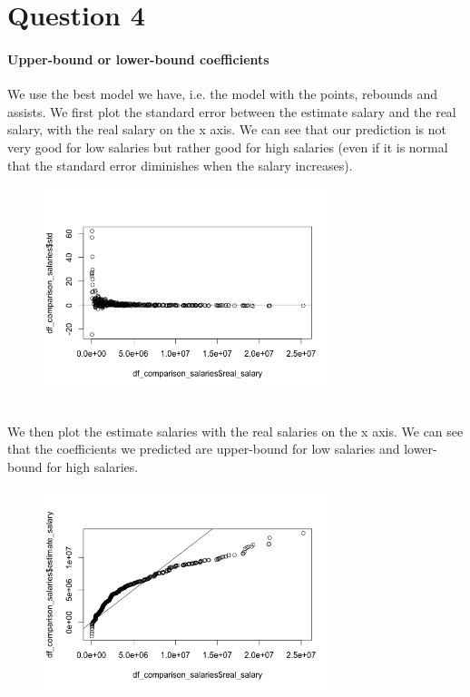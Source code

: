
\section*{Question 4}
\label{subsec:3Q4}

\paragraph{Upper-bound or lower-bound coefficients}We use the best model we have, i.e. the model with the points, rebounds and assists. 
We first plot the standard error between the estimate salary and the real salary, with the real salary on the x axis. We can see that our prediction is not very good for low salaries but rather good for high salaries (even if it is normal that the standard error diminishes when the salary increases).
\begin{figure}[h!]
\centering
\includegraphics[width=0.75\textwidth]{images/Std_error}
\end{figure}
\\
We then plot the estimate salaries with the real salaries on the x axis. We can see that the coefficients we predicted are upper-bound for low salaries and lower-bound for high salaries.
\begin{figure}[h!]
\centering
\includegraphics[width=0.75\textwidth]{images/Estimate_salaries}
\end{figure}

